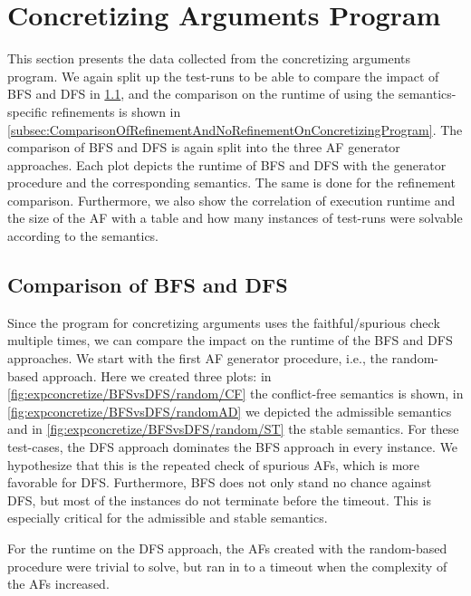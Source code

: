 \section{Concretizing Arguments Program}
\label{sec:ConcretizingArgumentsProgram}

This section presents the data collected from the concretizing arguments program. We again split up the test-runs to be able to compare the impact of BFS and DFS in \cref{subsec:ComparisonOfBFSandDFSApproachForConretizingArguments}, and the comparison on the runtime of using the semantics-specific refinements is shown in \cref{subsec:ComparisonOfRefinementAndNoRefinementOnConcretizingProgram}. The comparison of BFS and DFS is again split into the three AF generator approaches. Each plot depicts the runtime of BFS and DFS with the generator procedure and the corresponding semantics. The same is done for the refinement comparison. Furthermore, we also show the correlation of execution runtime and the size of the AF with a table and how many instances of test-runs were solvable according to the semantics.


\subsection{Comparison of BFS and DFS}
\label{subsec:ComparisonOfBFSandDFSApproachForConretizingArguments}

Since the program for concretizing arguments uses the faithful/spurious check multiple times, we can compare the impact on the runtime of the BFS and DFS approaches. We start with the first AF generator procedure, i.e., the random-based approach. Here we created three plots: in \cref{fig:expconcretize/BFSvsDFS/random/CF} the conflict-free semantics is shown, in \cref{fig:expconcretize/BFSvsDFS/randomAD} we depicted the admissible semantics and in \cref{fig:expconcretize/BFSvsDFS/random/ST} the stable semantics. For these test-cases, the DFS approach dominates the BFS approach in every instance. We hypothesize that this is the repeated check of spurious AFs, which is more favorable for DFS. Furthermore, BFS does not only stand no chance against DFS, but most of the instances do not terminate before the timeout. This is especially critical for the admissible and stable semantics. 

For the runtime on the DFS approach, the AFs created with the random-based procedure were trivial to solve, but ran in to a timeout when the complexity of the AFs increased.


